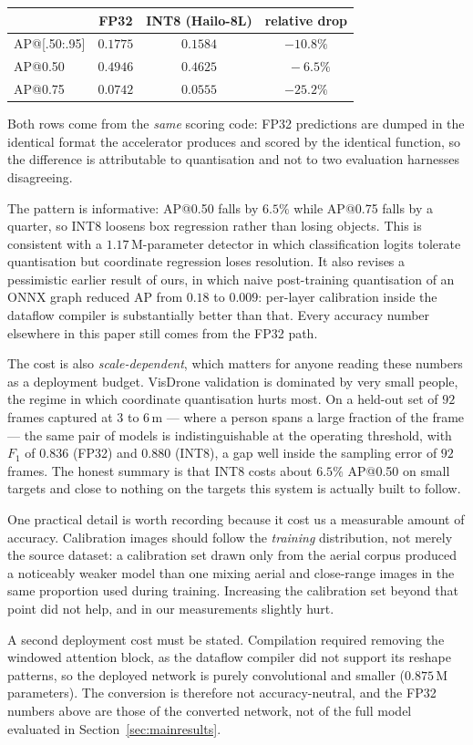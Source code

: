 \begin{center}
\small
\begin{tabular}{lccc}
\toprule
 & FP32 & INT8 (Hailo-8L) & relative drop \\
\midrule
AP@[.50:.95] & $0.1775$ & $0.1584$ & $-10.8\%$ \\
AP@0.50      & $0.4946$ & $0.4625$ & $\phantom{0}-6.5\%$ \\
AP@0.75      & $0.0742$ & $0.0555$ & $-25.2\%$ \\
\bottomrule
\end{tabular}
\end{center}

Both rows come from the \emph{same} scoring code: FP32 predictions are dumped in the
identical format the accelerator produces and scored by the identical function, so the
difference is attributable to quantisation and not to two evaluation harnesses
disagreeing.

The pattern is informative: AP@0.50 falls by $6.5\%$ while AP@0.75 falls by a quarter,
so INT8 loosens box regression rather than losing objects. This is consistent with a
$1.17$\,M-parameter detector in which classification logits tolerate quantisation but
coordinate regression loses resolution. It also revises a pessimistic earlier result of
ours, in which naive post-training quantisation of an ONNX graph reduced AP from $0.18$
to $0.009$: per-layer calibration inside the dataflow compiler is substantially better
than that. Every accuracy number elsewhere in this paper still comes from the FP32 path.

The cost is also \emph{scale-dependent}, which matters for anyone reading these numbers
as a deployment budget. VisDrone validation is dominated by very small people, the regime
in which coordinate quantisation hurts most. On a held-out set of $92$ frames captured at
$3$ to $6$\,m --- where a person spans a large fraction of the frame --- the same pair of
models is indistinguishable at the operating threshold, with $F_1$ of $0.836$ (FP32) and
$0.880$ (INT8), a gap well inside the sampling error of $92$ frames. The honest summary is
that INT8 costs about $6.5\%$ AP@0.50 on small targets and close to nothing on the targets
this system is actually built to follow.

One practical detail is worth recording because it cost us a measurable amount of
accuracy. Calibration images should follow the \emph{training} distribution, not merely
the source dataset: a calibration set drawn only from the aerial corpus produced a
noticeably weaker model than one mixing aerial and close-range images in the same
proportion used during training. Increasing the calibration set beyond that point did not
help, and in our measurements slightly hurt.

A second deployment cost must be stated. Compilation required removing the windowed
attention block, as the dataflow compiler did not support its reshape patterns, so
the deployed network is purely convolutional and smaller ($0.875$\,M parameters).
The conversion is therefore not accuracy-neutral, and the FP32 numbers above are
those of the converted network, not of the full model evaluated in
Section~\ref{sec:mainresults}.
